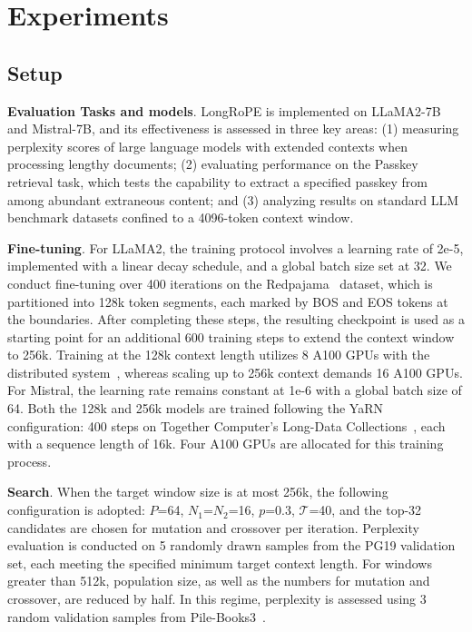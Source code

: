  \section{Experiments}

\label{sec:exp}
\subsection{Setup}
\textbf{Evaluation Tasks and models}. LongRoPE is implemented on LLaMA2-7B and Mistral-7B, and its effectiveness is assessed in three key areas: (1) measuring perplexity scores of large language models with extended contexts when processing lengthy documents; (2) evaluating performance on the Passkey retrieval task, which tests the capability to extract a specified passkey from among abundant extraneous content; and (3) analyzing results on standard LLM benchmark datasets confined to a 4096-token context window.

\textbf{Fine-tuning}. For LLaMA2, the training protocol involves a learning rate of 2e-5, implemented with a linear decay schedule, and a global batch size set at 32. We conduct fine-tuning over 400 iterations on the Redpajama~\cite{redpajama} dataset, which is partitioned into 128k token segments, each marked by BOS and EOS tokens at the boundaries. After completing these steps, the resulting checkpoint is used as a starting point for an additional 600 training steps to extend the context window to 256k. Training at the 128k context length utilizes 8 A100 GPUs with the distributed system~\cite{cube}, whereas scaling up to 256k context demands 16 A100 GPUs. For Mistral, the learning rate remains constant at 1e-6 with a global batch size of 64. Both the 128k and 256k models are trained following the YaRN~\cite{yarn} configuration: 400 steps on Together Computer's Long-Data Collections~\cite{mistraldata}, each with a sequence length of 16k. Four A100 GPUs are allocated for this training process.

\textbf{Search}. When the target window size is at most 256k, the following configuration is adopted: $P$=64, $N_1$=$N_2$=16, $p$=0.3, $\mathcal{T}$=40, and the top-32 candidates are chosen for mutation and crossover per iteration. Perplexity evaluation is conducted on 5 randomly drawn samples from the PG19 validation set, each meeting the specified minimum target context length. For windows greater than 512k, population size, as well as the numbers for mutation and crossover, are reduced by half. In this regime, perplexity is assessed using 3 random validation samples from Pile-Books3~\cite{pile}.

